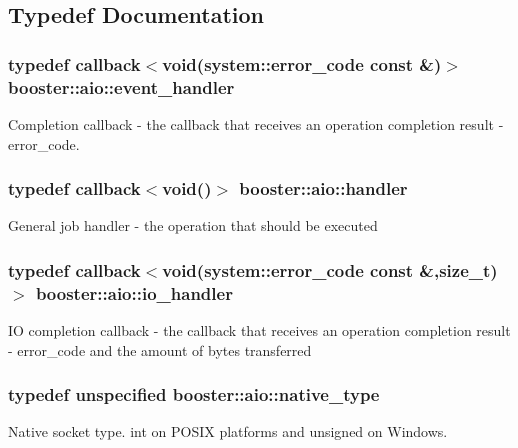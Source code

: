 \subsection{\-Typedef \-Documentation}
\subsubsection[{event\-\_\-handler}]{\setlength{\rightskip}{0pt plus 5cm}typedef callback$<$void({\bf system\-::error\-\_\-code} const \&)$>$ {\bf booster\-::aio\-::event\-\_\-handler}}\label{namespacebooster_1_1aio_a6f0da1262eee438aff012673690a0930}
\-Completion callback -\/ the callback that receives an operation completion result -\/ error\-\_\-code. 
\subsubsection[{handler}]{\setlength{\rightskip}{0pt plus 5cm}typedef callback$<$void()$>$ {\bf booster\-::aio\-::handler}}\label{namespacebooster_1_1aio_ab53e9a02670be9c7c93a1b54cec00c97}
\-General job handler -\/ the operation that should be executed 
\subsubsection[{io\-\_\-handler}]{\setlength{\rightskip}{0pt plus 5cm}typedef callback$<$void({\bf system\-::error\-\_\-code} const \&,size\-\_\-t)$>$ {\bf booster\-::aio\-::io\-\_\-handler}}\label{namespacebooster_1_1aio_ade0aeea672877a3dde3b8ce4b9ac34e5}
\-I\-O completion callback -\/ the callback that receives an operation completion result -\/ error\-\_\-code and the amount of bytes transferred 
\subsubsection[{native\-\_\-type}]{\setlength{\rightskip}{0pt plus 5cm}typedef unspecified {\bf booster\-::aio\-::native\-\_\-type}}\label{namespacebooster_1_1aio_ae7a1db68591232cb0423fbdf7924a204}
\-Native socket type. int on \-P\-O\-S\-I\-X platforms and unsigned on \-Windows. 

